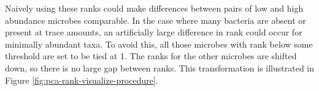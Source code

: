 Naively using these ranks could make differences between pairs of low
and high abundance microbes comparable. In the case where many bacteria are absent or present at trace amounts, an artificially large difference in rank could occur\cite{holmes2011} for minimally abundant taxa.
To avoid this, all those
microbes with rank below some threshold are set to be tied at 1. The ranks for
the other microbes are shifted down, so there is no large gap between
ranks. This transformation is illustrated in Figure
\ref{fig:pca-rank-visualize-procedure}.

\begin{knitrout}
\color{fgcolor}\begin{kframe}
\begin{alltt}
 \hlkwb{<-}  \hlopt{-} 
\hlstd{abund_ranks[abund_ranks} \hlopt{<} \hlstd{]} \hlkwb{<-} 
\end{alltt}
\end{kframe}
\end{knitrout}

